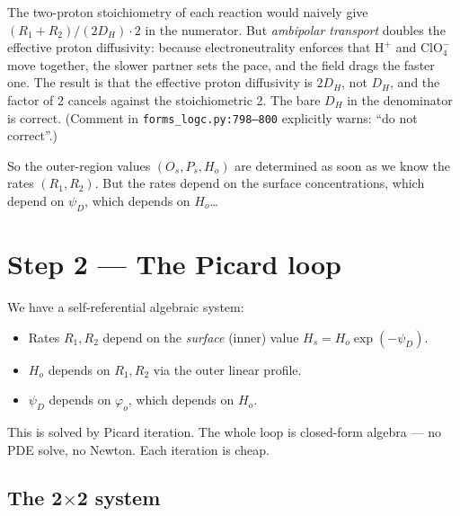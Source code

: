 \documentclass[11pt]{article}
\begin{document}
\begin{tcolorbox}[notebox, title={Why the proton denominator is $D_H$, not $2 D_H$}]
The two-proton stoichiometry of each reaction would naively give
$(R_1+R_2)/(2 D_H) \cdot 2$ in the numerator. But \emph{ambipolar
transport} doubles the effective proton diffusivity: because
electroneutrality enforces that $\mathrm{H^+}$ and $\mathrm{ClO_4^-}$
move together, the slower partner sets the pace, and the field
drags the faster one. The result is that the effective proton
diffusivity is $2 D_H$, not $D_H$, and the factor of 2 cancels
against the stoichiometric 2. The bare $D_H$ in the denominator is
correct. (Comment in
\texttt{forms\_logc.py:798--800} explicitly warns: ``do not
correct''.)
\end{tcolorbox}

So the outer-region values $(O_s, P_s, H_o)$ are determined as soon as
we know the rates $(R_1, R_2)$. But the rates depend on the surface
concentrations, which depend on $\psi_D$, which depends on $H_o$\dots

\section{Step 2 --- The Picard loop}

We have a self-referential algebraic system:
\begin{itemize}
\item Rates $R_1, R_2$ depend on the \emph{surface} (inner) value
      $H_s = H_o \exp(-\psi_D)$.
\item $H_o$ depends on $R_1, R_2$ via the outer linear profile.
\item $\psi_D$ depends on $\varphi_o$, which depends on $H_o$.
\end{itemize}
This is solved by Picard iteration. The whole loop is closed-form
algebra --- no PDE solve, no Newton. Each iteration is cheap.

\subsection{The 2$\times$2 system}
\end{document}
